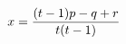\documentclass[preview]{standalone}
\begin{document}
\begin{align*}
\special{dvisvgm:raw <g id='unique000'>}x=\frac{(t-1)p-q+r}{t(t-1)}\special{dvisvgm:raw </g>}
\end{align*}
\end{document}
